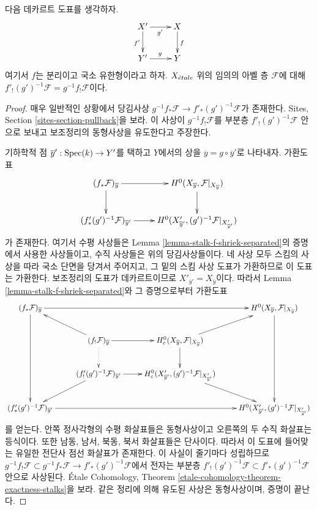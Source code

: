 \begin{lemma}
\label{lemma-base-change-f-shriek-separated}
다음 데카르트 도표를 생각하자.
$$
\xymatrix{
X' \ar[r]_{g'} \ar[d]_{f'} & X \ar[d]^f \\
Y' \ar[r]^g & Y
}
$$
여기서 $f$는 분리이고 국소 유한형이라고 하자. $X_{\acute{e}tale}$ 위의 임의의
아벨 층 $\mathcal{F}$에 대해
$f'_!(g')^{-1}\mathcal{F} = g^{-1}f_!\mathcal{F}$이다.
\end{lemma}

\begin{proof}
매우 일반적인 상황에서 당김사상
$g^{-1}f_*\mathcal{F} \to f'_*(g')^{-1}\mathcal{F}$가 존재한다.
Sites, Section \ref{sites-section-pullback}을 보라. 이 사상이
$g^{-1}f_!\mathcal{F}$를 부분층 $f'_!(g')^{-1}\mathcal{F}$ 안으로
보내고 보조정리의 동형사상을 유도한다고 주장한다.

\medskip\noindent
기하학적 점 $\overline{y}' : \mathop{\mathrm{Spec}}(k) \to Y'$를 택하고 $Y$에서의 상을
$\overline{y} = g \circ \overline{y}'$로 나타내자. 가환도표
$$
\xymatrix{
(f_*\mathcal{F})_{\overline{y}} \ar[r] \ar[d] &
H^0(X_{\overline{y}}, \mathcal{F}|_{X_{\overline{y}}}) \ar[d] \\
(f'_*(g')^{-1}\mathcal{F})_{\overline{y}'} \ar[r] &
H^0(X'_{\overline{y}'}, (g')^{-1}\mathcal{F}|_{X'_{\overline{y}'}})
}
$$
가 존재한다. 여기서 수평 사상들은 Lemma
\ref{lemma-stalk-f-shriek-separated}의 증명에서 사용한 사상들이고,
수직 사상들은 위의 당김사상들이다. 네 사상 모두 스킴의 사상을 따라
국소 단면을 당겨서 주어지고, 그 밑의 스킴 사상 도표가 가환하므로 이
도표는 가환한다. 보조정리의 도표가 데카르트이므로
$X'_{\overline{y}'} = X_{\overline{y}}$이다. 따라서 Lemma
\ref{lemma-stalk-f-shriek-separated}와 그 증명으로부터 가환도표
$$
\xymatrix{
(f_*\mathcal{F})_{\overline{y}} \ar[rrr] \ar[ddd] & & &
H^0(X_{\overline{y}}, \mathcal{F}|_{X_{\overline{y}}}) \ar[ddd] \\
& (f_!\mathcal{F})_{\overline{y}} \ar[r] \ar@{..>}[d] \ar[lu] &
H^0_c(X_{\overline{y}}, \mathcal{F}|_{X_{\overline{y}}}) \ar[d] \ar[ru] \\
& (f'_!(g')^{-1}\mathcal{F})_{\overline{y}'} \ar[r] \ar[ld] &
H^0_c(X'_{\overline{y}'}, (g')^{-1}\mathcal{F}|_{X'_{\overline{y}'}}) \ar[rd]\\
(f'_*(g')^{-1}\mathcal{F})_{\overline{y}'} \ar[rrr] & & &
H^0(X'_{\overline{y}'}, (g')^{-1}\mathcal{F}|_{X'_{\overline{y}'}})
}
$$
를 얻는다. 안쪽 정사각형의 수평 화살표들은 동형사상이고 오른쪽의 두
수직 화살표는 등식이다. 또한 남동, 남서, 북동, 북서 화살표들은
단사이다. 따라서 이 도표에 들어맞는 유일한 전단사 점선 화살표가
존재한다. 이 사실이 줄기마다 성립하므로
$g^{-1}f_!\mathcal{F} \subset g^{-1}f_*\mathcal{F}
\to f'_*(g')^{-1}\mathcal{F}$에서 전자는 부분층
$f'_!(g')^{-1}\mathcal{F} \subset f'_*(g')^{-1}\mathcal{F}$ 안으로
사상된다. \'Etale Cohomology, Theorem
\ref{etale-cohomology-theorem-exactness-stalks}을 보라.
같은 정리에 의해 유도된 사상은 동형사상이며, 증명이 끝난다.
\end{proof}

